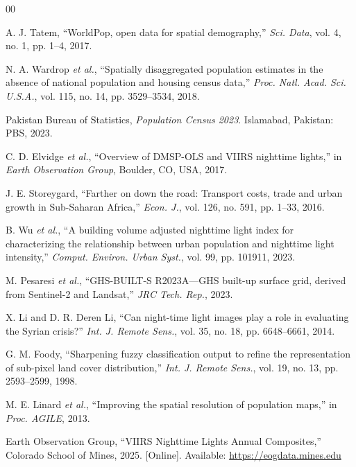\documentclass[conference]{IEEEtran}
\begin{document}
\begin{thebibliography}{00}

 A. J. Tatem, ``WorldPop, open data for spatial demography,'' \textit{Sci. Data}, vol. 4, no. 1, pp. 1--4, 2017.

 N. A. Wardrop \textit{et al.}, ``Spatially disaggregated population estimates in the absence of national population and housing census data,'' \textit{Proc. Natl. Acad. Sci. U.S.A.}, vol. 115, no. 14, pp. 3529--3534, 2018.

 Pakistan Bureau of Statistics, \textit{Population Census 2023}. Islamabad, Pakistan: PBS, 2023.

 C. D. Elvidge \textit{et al.}, ``Overview of DMSP-OLS and VIIRS nighttime lights,'' in \textit{Earth Observation Group}, Boulder, CO, USA, 2017.

 J. E. Storeygard, ``Farther on down the road: Transport costs, trade and urban growth in Sub-Saharan Africa,'' \textit{Econ. J.}, vol. 126, no. 591, pp. 1--33, 2016.

 B. Wu \textit{et al.}, ``A building volume adjusted nighttime light index for characterizing the relationship between urban population and nighttime light intensity,'' \textit{Comput. Environ. Urban Syst.}, vol. 99, pp. 101911, 2023.

 M. Pesaresi \textit{et al.}, ``GHS-BUILT-S R2023A---GHS built-up surface grid, derived from Sentinel-2 and Landsat,'' \textit{JRC Tech. Rep.}, 2023.

 X. Li and D. R. Deren Li, ``Can night-time light images play a role in evaluating the Syrian crisis?'' \textit{Int. J. Remote Sens.}, vol. 35, no. 18, pp. 6648--6661, 2014.

 G. M. Foody, ``Sharpening fuzzy classification output to refine the representation of sub-pixel land cover distribution,'' \textit{Int. J. Remote Sens.}, vol. 19, no. 13, pp. 2593--2599, 1998.

 M. E. Linard \textit{et al.}, ``Improving the spatial resolution of population maps,'' in \textit{Proc. AGILE}, 2013.

 Earth Observation Group, ``VIIRS Nighttime Lights Annual Composites,'' Colorado School of Mines, 2025. [Online]. Available: \url{https://eogdata.mines.edu}


\end{thebibliography}
\end{document}
